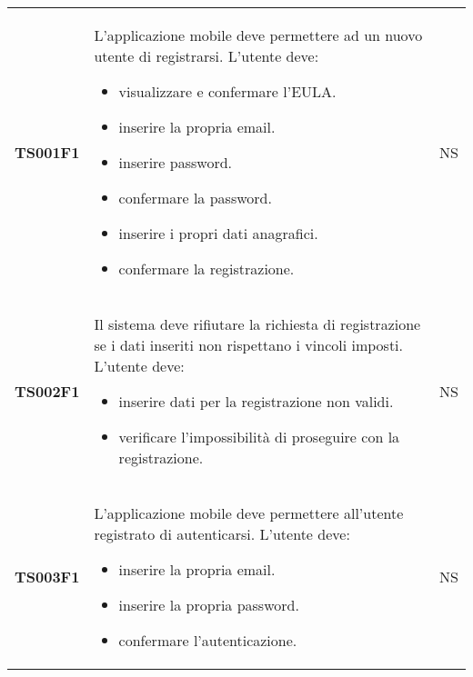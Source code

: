\documentclass[../piano-di-qualifica.tex]{subfiles}
\begin{document}
\begin{centering}
\begin{longtable}[H]{>{\centering\bfseries}m{3cm} >{}p{10cm} >{\centering\arraybackslash}m{3cm}}
    TS001F1            & L'applicazione mobile deve permettere ad un nuovo utente di registrarsi. \newline
    L'utente deve:
    \begin{itemize}
      \item visualizzare e confermare l'EULA\@.
      \item inserire la propria email.
      \item inserire password.
      \item confermare la password.
      \item inserire i propri dati anagrafici.
      \item confermare la registrazione.
    \end{itemize}
                       & NS                                                                                                                                                                                                                                                               \\
    TS002F1            & Il sistema deve rifiutare la richiesta di registrazione se i dati inseriti non rispettano i vincoli imposti. \newline
    L'utente deve:
    \begin{itemize}
      \item inserire dati per la registrazione non validi.
      \item verificare l'impossibilità di proseguire con la registrazione.
    \end{itemize}
                       & NS                                                                                                                                                                                                                                                               \\
    TS003F1            & L'applicazione mobile deve permettere all'utente registrato di autenticarsi. \newline
    L'utente deve:
    \begin{itemize}
      \item inserire la propria email.
      \item inserire la propria password.
      \item confermare l'autenticazione.
    \end{itemize}
                       & NS                                                                                                                                                                                                                                                               \\

\end{longtable}
\end{centering}
\end{document}
